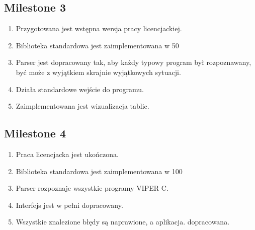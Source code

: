 \documentclass[a4paper,twoside,openright,11pt]{report}
\begin{document}
  \subsection {Milestone 3}
  \begin {enumerate}
    \item Przygotowana jest wstępna wersja pracy licencjackiej.
    \item Biblioteka standardowa jest zaimplementowana w 50%
    \item Parser jest dopracowany tak, aby każdy typowy program był rozpoznawany, być może z wyjątkiem skrajnie wyjątkowych sytuacji.
    \item Działa standardowe wejście do programu.
    \item Zaimplementowana jest wizualizacja tablic.
  \end {enumerate}
  \subsection {Milestone 4}
  \begin {enumerate}
    \item Praca licencjacka jest ukończona.
    \item Biblioteka standardowa jest zaimplementowana w 100%
    \item Parser rozpoznaje wszystkie programy VIPER C.
    \item Interfejs jest w pełni dopracowany.
    \item Wszystkie znalezione błędy są naprawione, a aplikacja. dopracowana.
  \end {enumerate}
\end{document}
